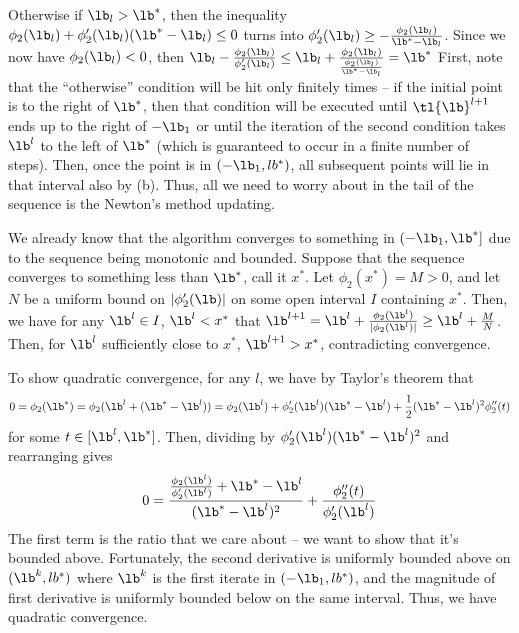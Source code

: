 \documentclass{article}
\begin{document}
Otherwise if $\lb_l>\lb^*$, then the inequality $\phi_2(\lb_l)+\phi_2'(\lb_l)(\lb^*-\lb_l)\leq0$ turns into $\phi_2'(\lb_l)\geq-\frac{\phi_2(\lb_l)}{\lb^*-\lb_l}$. Since we now have $\phi_2(\lb_l)<0$, then $\lb_l-\frac{\phi_2(\lb_l)}{\phi_2'(\lb_l)}\leq\lb_l+\frac{\phi_2(\lb_l)}{\frac{\phi_2(\lb_l)}{\lb^*-\lb_l}}=\lb^*$
First, note that the ``otherwise'' condition will be hit only finitely times -- if the initial point is to the right of $\lb^*$, then that condition will be executed until $\tl{\lb}^{l+1}$ ends up to the right of $-\lb_1$ or until the iteration of the second condition takes $\lb^l$ to the left of $\lb^*$ (which is guaranteed to occur in a finite number of steps). Then, once the point is in $(-\lb_1,lb^*)$, all subsequent points will lie in that interval also by (b). Thus, all we need to worry about in the tail of the sequence is the Newton's method updating.

We already know that the algorithm converges to something in $(-\lb_1, \lb^*]$ due to the sequence being monotonic and bounded. Suppose that the sequence converges to something less than $\lb^*$, call it $x^*$. Let $\phi_2(x^*)=M>0$, and let $N$ be a uniform bound on $|\phi_2'(\lb)|$ on some open interval $I$ containing $x^*$. Then, we have for any $\lb^l\in I$, $\lb^l<x^*$ that $\lb^{l+1}=\lb^l+\frac{\phi_2(\lb^l)}{|\phi_2(\lb^l)|}\geq\lb^l+\frac{M}{N}$. Then, for $\lb^l$ sufficiently close to $x^*$, $\lb^{l+1}>x^*$, contradicting convergence.

To show quadratic convergence, for any $l$, we have by Taylor's theorem that
\[0=\phi_2(\lb^*)=\phi_2(\lb^l+(\lb^*-\lb^l))=\phi_2(\lb^l)+\phi_2'(\lb^l)(\lb^*-\lb^l)+\frac{1}{2}(\lb^*-\lb^l)^2\phi_2''(t)\]
for some $t\in[\lb^l,\lb^*]$. Then, dividing by $\phi_2'(\lb^l)(\lb^*-\lb^l)^2$ and rearranging gives
\[0=\frac{\frac{\phi_2(\lb^l)}{\phi_2'(\lb^l)}+\lb^*-\lb^l}{(\lb^*-\lb^l)^2}+\frac{\phi_2''(t)}{\phi_2'(\lb^l)}\]
The first term is the ratio that we care about -- we want to show that it's bounded above. Fortunately, the second derivative is uniformly bounded above on $(\lb^k, lb^*)$ where $\lb^k$ is the first iterate in $(-\lb_1,lb^*)$, and the magnitude of first derivative is uniformly bounded below on the same interval. Thus, we have quadratic convergence.
\end{document}
